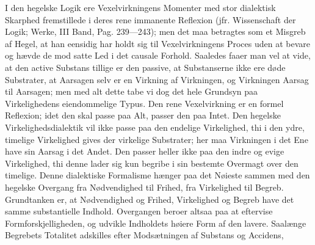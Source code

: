 \documentclass[12pt]{book}
\newcommand{\opage}[1]{\marginnote{\footnotesize\textit{[#1]}}}
\begin{document}
I den hegelske Logik ere Vexelvirkningens Momenter med stor dialektisk Skarphed
fremstillede i deres rene immanente Reflexion (jfr. Wissenschaft der Logik; Werke, III
Band, Pag. 239---243); men det maa betragtes som et Misgreb af Hegel, at han eensidig
har holdt sig til Vexelvirkningens Proces uden at bevare og hævde de mod
\opage{176} %
%
%
satte Led i det causale Forhold. Saaledes faaer man vel at vide, at den active Substans
tillige er den passive, at Substanserne ikke ere døde Substrater, at Aarsagen selv er en
Virkning af Virkningen, og Virkningen Aarsag til Aarsagen; men med alt dette tabe vi dog
det hele Grundsyn paa Virkelighedens eiendommelige Typus. Den rene Vexelvirkning er en
formel Reflexion; idet den skal passe paa Alt, passer den paa Intet. Den hegelske
Virkelighedsdialektik vil ikke passe paa den endelige Virkelighed, thi i den ydre,
timelige Virkelighed gives der virkelige Substrater; her maa Virkningen i det Ene have
sin Aarsag i det Andet. Den passer heller ikke paa den indre og evige Virkelighed, thi
denne lader sig kun begribe i sin bestemte Overmagt over den timelige. Denne dialektiske
Formalisme hænger paa det Nøieste sammen med den hegelske Overgang fra Nødvendighed til
Frihed, fra Virkelighed til Begreb. Grundtanken er, at Nødvendighed og Frihed,
Virkelighed og Begreb have det samme substantielle Indhold. Overgangen beroer altsaa paa
at eftervise Formforskjelligheden, og udvikle Indholdets høiere Form af den lavere.
Saalænge Begrebets Totalitet adskilles efter Modsætningen af Substans og Accidens,
\end{document}
